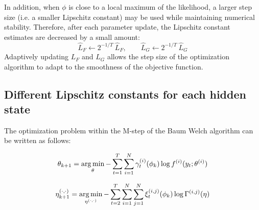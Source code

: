 In addition, when $\phi$ is close to a local maximum of the likelihood, a larger step size (i.e. a smaller Lipschitz constant) may be used while maintaining numerical stability. Therefore, after each parameter update, the Lipschitz constant estimates are decreased by a small amount:
%
\begin{equation}
    \hat L_F \leftarrow 2^{-1/T} ~ \hat L_F, \qquad \hat L_G \leftarrow 2^{-1/T} ~ \hat L_G
\end{equation}
%
Adaptively updating $L_F$ and $L_G$ allows the step size of the optimization algorithm to adapt to the smoothness of the objective function.





\subsection{Different Lipschitz constants for each hidden state}
\label{subsec:diff_Ls}

The optimization problem within the M-step of the Baum Welch algorithm can be written as follows:

\begin{equation} 
    \theta_{k+1} = \operatorname*{arg\,min}_{\theta} - \sum_{t=1}^T \sum_{i=1}^N \gamma^{(i)}_t(\phi_{k}) \log f^{(i)}(y_t;\theta^{(i)})
\end{equation}

\begin{equation}
    \eta^{(\cdot,\cdot)}_{k+1} = \operatorname*{arg\,min}_{\eta^{(\cdot,\cdot)}} - \sum_{t=2}^T \sum_{i=1}^N \sum_{j=1}^N \xi^{(i,j)}_t(\phi_{k}) \log \Gamma^{(i,j)}(\eta)
\end{equation}

